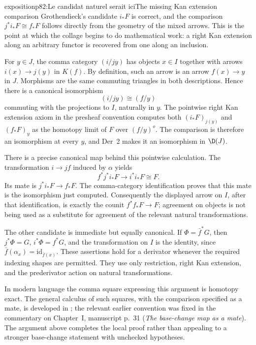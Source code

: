 \begin{dcomment}{exposition}{p82:Le candidat naturel serait ici}{The missing Kan extension comparison}
Grothendieck's candidate \(i_*F\) is correct, and the comparison \(j^*i_*F\cong f_*F\) follows directly from the geometry of the mixed arrows. This is the point at which the collage begins to do mathematical work: a right Kan extension along an arbitrary functor is recovered from one along an inclusion.

For \(y\in J\), the comma category \((i/jy)\) has objects \(x\in I\) together with arrows \(i(x)\to j(y)\) in \(K(f)\). By definition, such an arrow is an arrow \(f(x)\to y\) in \(J\). Morphisms are the same commuting triangles in both descriptions. Hence there is a canonical isomorphism
\[
 (i/jy)\cong(f/y)
\]
commuting with the projections to \(I\), naturally in \(y\). The pointwise right Kan extension axiom in the presheaf convention computes both
\((i_*F)_{j(y)}\) and \((f_*F)_y\) as the homotopy limit of \(F\) over \((f/y)^o\). The comparison is therefore an isomorphism at every \(y\), and Der~2 makes it an isomorphism in \(\D(J)\).

There is a precise canonical map behind this pointwise calculation. The transformation
\(i\to jf\) induced by \(\alpha\) yields
\[
 f^*j^*i_*F\longrightarrow i^*i_*F\cong F.
\]
Its mate is \(j^*i_*F\to f_*F\). The comma-category identification proves that this mate is the isomorphism just computed. Consequently the displayed arrow on \(I\), after that identification, is exactly the counit \(f^*f_*F\to F\); agreement on objects is not being used as a substitute for agreement of the relevant natural transformations.

The other candidate is immediate but equally canonical. If \(\Phi=\bar f^*G\), then \(j^*\Phi=G\), \(i^*\Phi=f^*G\), and the transformation on \(I\) is the identity, since \(\bar f(\alpha_x)=\mathrm{id}_{\bar f(x)}\). These assertions hold for a derivator whenever the required indexing shapes are permitted. They use only restriction, right Kan extension, and the prederivator action on natural transformations.

In modern language the comma square expressing this argument is homotopy exact. The general calculus of such squares, with the comparison specified as a mate, is developed in \citet[Proposition 1.26]{Groth2013}; the relevant earlier convention was fixed in the commentary on Chapter~I, manuscript p.~31 (\emph{The base-change map as a mate}). The argument above completes the local proof rather than appealing to a stronger base-change statement with unchecked hypotheses.
\end{dcomment}

